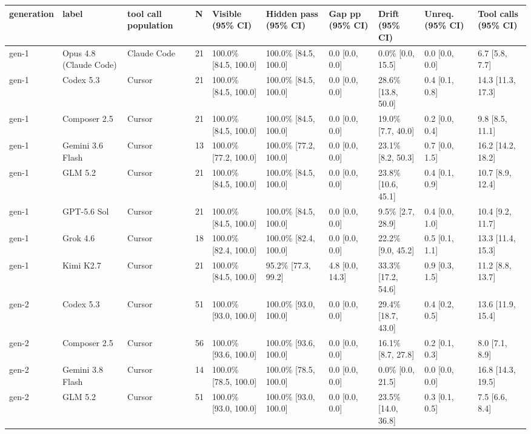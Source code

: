 \begin{tabular}{llllllllll}
\toprule
generation & label & tool call population & N & Visible (95\% CI) & Hidden pass (95\% CI) & Gap pp (95\% CI) & Drift (95\% CI) & Unreq. (95\% CI) & Tool calls (95\% CI) \\
\midrule
gen-1 & Opus 4.8 (Claude Code) & Claude Code & 21 & 100.0\% [84.5, 100.0] & 100.0\% [84.5, 100.0] & 0.0 [0.0, 0.0] & 0.0\% [0.0, 15.5] & 0.0 [0.0, 0.0] & 6.7 [5.8, 7.7] \\
gen-1 & Codex 5.3 & Cursor & 21 & 100.0\% [84.5, 100.0] & 100.0\% [84.5, 100.0] & 0.0 [0.0, 0.0] & 28.6\% [13.8, 50.0] & 0.4 [0.1, 0.8] & 14.3 [11.3, 17.3] \\
gen-1 & Composer 2.5 & Cursor & 21 & 100.0\% [84.5, 100.0] & 100.0\% [84.5, 100.0] & 0.0 [0.0, 0.0] & 19.0\% [7.7, 40.0] & 0.2 [0.0, 0.4] & 9.8 [8.5, 11.1] \\
gen-1 & Gemini 3.6 Flash & Cursor & 13 & 100.0\% [77.2, 100.0] & 100.0\% [77.2, 100.0] & 0.0 [0.0, 0.0] & 23.1\% [8.2, 50.3] & 0.7 [0.0, 1.5] & 16.2 [14.2, 18.2] \\
gen-1 & GLM 5.2 & Cursor & 21 & 100.0\% [84.5, 100.0] & 100.0\% [84.5, 100.0] & 0.0 [0.0, 0.0] & 23.8\% [10.6, 45.1] & 0.4 [0.1, 0.9] & 10.7 [8.9, 12.4] \\
gen-1 & GPT-5.6 Sol & Cursor & 21 & 100.0\% [84.5, 100.0] & 100.0\% [84.5, 100.0] & 0.0 [0.0, 0.0] & 9.5\% [2.7, 28.9] & 0.4 [0.0, 1.0] & 10.4 [9.2, 11.7] \\
gen-1 & Grok 4.6 & Cursor & 18 & 100.0\% [82.4, 100.0] & 100.0\% [82.4, 100.0] & 0.0 [0.0, 0.0] & 22.2\% [9.0, 45.2] & 0.5 [0.1, 1.1] & 13.3 [11.4, 15.3] \\
gen-1 & Kimi K2.7 & Cursor & 21 & 100.0\% [84.5, 100.0] & 95.2\% [77.3, 99.2] & 4.8 [0.0, 14.3] & 33.3\% [17.2, 54.6] & 0.9 [0.3, 1.5] & 11.2 [8.8, 13.7] \\
gen-2 & Codex 5.3 & Cursor & 51 & 100.0\% [93.0, 100.0] & 100.0\% [93.0, 100.0] & 0.0 [0.0, 0.0] & 29.4\% [18.7, 43.0] & 0.4 [0.2, 0.5] & 13.6 [11.9, 15.4] \\
gen-2 & Composer 2.5 & Cursor & 56 & 100.0\% [93.6, 100.0] & 100.0\% [93.6, 100.0] & 0.0 [0.0, 0.0] & 16.1\% [8.7, 27.8] & 0.2 [0.1, 0.3] & 8.0 [7.1, 8.9] \\
gen-2 & Gemini 3.8 Flash & Cursor & 14 & 100.0\% [78.5, 100.0] & 100.0\% [78.5, 100.0] & 0.0 [0.0, 0.0] & 0.0\% [0.0, 21.5] & 0.0 [0.0, 0.0] & 16.8 [14.3, 19.5] \\
gen-2 & GLM 5.2 & Cursor & 51 & 100.0\% [93.0, 100.0] & 100.0\% [93.0, 100.0] & 0.0 [0.0, 0.0] & 23.5\% [14.0, 36.8] & 0.3 [0.1, 0.5] & 7.5 [6.6, 8.4] \\

\end{tabular}
